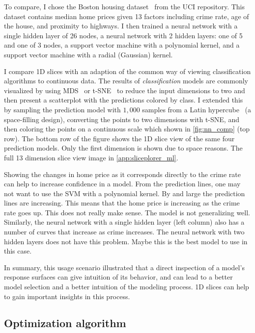 To compare, I chose the Boston housing dataset~\cite{Lichman:2013} from the
UCI repository. This dataset contains median home prices
given 13 factors including crime rate, age of the house, and proximity to
highways. I then trained a neural network with a single hidden layer of 26
nodes, a neural network with 2 hidden layers: one of 5 and one of 3 nodes, a
support vector machine with a polynomial kernel, and a support vector machine
with a radial (Gaussian) kernel.

I compare 1D slices with an adaption of the common way of viewing
classification algorithms to continuous data.
The results of \emph{classification} models are commonly visualized
by using MDS~\cite{Kruskal:1964} or t-SNE~\cite{Maaten:2008} to reduce the input
dimensions to two and then present a scatterplot with the predictions colored
by class. I extended this by sampling the prediction model with \(1,000\)
samples from a Latin hypercube~\cite{Tang:1993} (a space-filling design),
converting the points to two dimensions with t-SNE, and then coloring the points
on a continuous scale which shown in \autoref{fig:nn_comp} (top row).  The
bottom row of the figure shows the 1D slice view of the same four prediction
models. Only the first dimension is shown due to space reasons. The full 13
dimension slice view image in \autoref{app:sliceplorer_ml}.

Showing the changes in home price as it corresponds directly to the crime rate
can help to increase confidence in a model.  From the prediction lines, one may
not want to use the SVM with a polynomial kernel. By and large the prediction
lines are increasing. This means that the home price is increasing as the crime
rate goes up. This does not really make sense. The model is not generalizing
well. Similarly, the neural network with a single hidden layer (left column)
also has a number of curves that increase as crime increases. The neural
network with two hidden layers does not have this problem. Maybe this is the
best model to use in this case.

In summary, this usage scenario illustrated that a direct inspection of a
model's response surfaces can give intuition of its behavior, and can lead to a
better model selection and a better intuition of the modeling process. 1D
slices can help to gain important insights in this process. 

\subsection{Optimization algorithm}
\label{sec:optimization}

